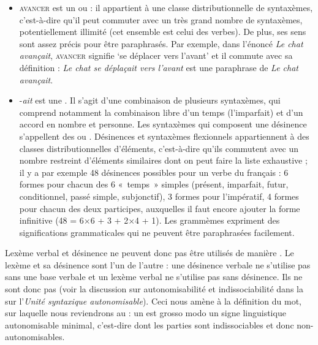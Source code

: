 \begin{itemize}
\item \textsc{avancer} est un  ou : il appartient à une classe distributionnelle  de syntaxèmes, c’est-à-dire qu’il peut commuter avec un très grand nombre de syntaxèmes, potentiellement illimité (cet ensemble est celui des verbes). De plus, ses sens sont assez précis pour être paraphrasés. Par exemple, dans l’énoncé \textit{Le chat avançait}, \textsc{avancer} signifie ‘se déplacer vers l’avant’ et il commute avec sa définition : \textit{Le chat se déplaçait vers l’avant} est une paraphrase de \textit{Le chat avançait}.
\item {}-\textit{ait} est une . Il s’agit d’une combinaison de plusieurs syntaxèmes, qui comprend notamment la combinaison libre d’un temps (l’imparfait) et d’un accord en nombre et personne. Les syntaxèmes qui composent une désinence s’appellent des  ou . Désinences et syntaxèmes flexionnels appartiennent à des classes distributionnelles  d’éléments, c’est-à-dire qu’ils commutent avec un nombre restreint d’éléments similaires dont on peut faire la liste exhaustive ; il y a par exemple 48 désinences possibles pour un verbe du français : 6 formes pour chacun des 6 «~temps~» simples (présent, imparfait, futur, conditionnel, passé simple, subjonctif), 3 formes pour l'impératif, 4 formes pour chacun des deux participes, auxquelles il faut encore ajouter la forme infinitive (48 = 6${\times}$6 + 3 + 2${\times}$4 + 1). Les grammèmes expriment des significations grammaticales qui ne peuvent être paraphrasées facilement.
\end{itemize}

Lexème verbal et désinence ne peuvent donc pas être utilisés de manière . Le lexème et sa désinence sont  l’un de l’autre : une désinence verbale ne s’utilise pas sans une base verbale et un lexème verbal ne s’utilise pas sans désinence. Ils ne sont donc pas  (voir la discussion sur autonomisabilité et indissociabilité dans la  sur l'\textit{Unité syntaxique autonomisable}). Ceci nous amène à la définition du mot, sur laquelle nous reviendrons au  : un  est grosso modo un signe linguistique autonomisable minimal, c’est-dire dont les parties sont indissociables et donc non-autonomisables.

